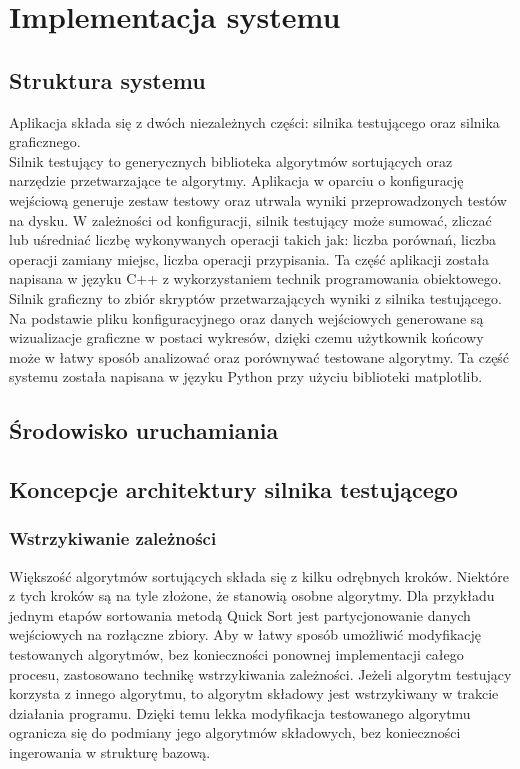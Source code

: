 \chapter{Implementacja systemu}
\thispagestyle{chapterBeginStyle}

\section{Struktura systemu}
Aplikacja składa się z dwóch niezależnych części: silnika testującego oraz silnika graficznego.\\

Silnik testujący to generycznych biblioteka algorytmów sortujących oraz narzędzie przetwarzające
te algorytmy. Aplikacja w oparciu o konfigurację wejściową generuje zestaw testowy oraz utrwala
wyniki przeprowadzonych testów na dysku. W zależności od konfiguracji, silnik testujący może
sumować, zliczać lub uśredniać liczbę wykonywanych operacji takich jak: liczba porównań, liczba
operacji zamiany miejsc, liczba operacji przypisania. Ta część aplikacji została napisana w języku
C++ z wykorzystaniem technik programowania obiektowego.\\

Silnik graficzny to zbiór skryptów przetwarzających wyniki z silnika testującego. Na podstawie pliku
konfiguracyjnego oraz danych wejściowych generowane są wizualizacje graficzne w postaci wykresów, dzięki
czemu użytkownik końcowy może w łatwy sposób analizować oraz porównywać testowane algorytmy. Ta część
systemu została napisana w języku Python przy użyciu biblioteki matplotlib.

\section{Środowisko uruchamiania}

\section{Koncepcje architektury silnika testującego}

\subsection{Wstrzykiwanie zależności}
Większość algorytmów sortujących składa się z kilku odrębnych kroków. Niektóre z tych kroków są na tyle
złożone, że stanowią osobne algorytmy. Dla przykładu jednym etapów sortowania metodą Quick Sort
jest partycjonowanie danych wejściowych na rozłączne zbiory. Aby w łatwy sposób umożliwić modyfikację
testowanych algorytmów, bez konieczności ponownej implementacji całego procesu, zastosowano technikę
wstrzykiwania zależności. Jeżeli algorytm testujący korzysta z innego algorytmu, to algorytm składowy
jest wstrzykiwany w trakcie działania programu. Dzięki temu lekka modyfikacja testowanego algorytmu
ogranicza się do podmiany jego algorytmów składowych, bez konieczności ingerowania w strukturę bazową.

